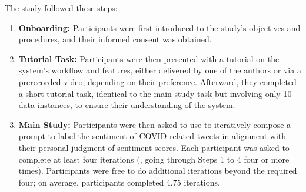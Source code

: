 The study followed these steps:

\begin{enumerate}

\item 
\textbf{Onboarding:}
Participants were first introduced to the study's objectives and procedures, and their informed consent was obtained.

\item 
\textbf{Tutorial Task:}
Participants were then presented with a tutorial on the system's workflow and features, either delivered by one of the authors or via a prerecorded video, depending on their preference. 
Afterward, they completed a short tutorial task, identical to the main study task but involving only 10 data instances, to ensure their understanding of the system.

\item 
\textbf{Main Study:}
Participants were then asked to use \system to iteratively compose a prompt to label the sentiment of COVID-related tweets in alignment with their personal judgment of sentiment scores. 
Each participant was asked to complete at least four iterations (\ie, going through Steps 1 to 4 four or more times).
Participants were free to do additional iterations beyond the required four; on average, participants completed 4.75 iterations.


\end{enumerate}
